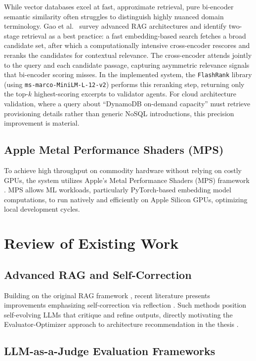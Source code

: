 While vector databases excel at fast, approximate retrieval, pure bi-encoder semantic similarity often struggles to distinguish highly nuanced domain terminology. Gao et al.~\cite{gao2023retrieval} survey advanced RAG architectures and identify two-stage retrieval as a best practice: a fast embedding-based search fetches a broad candidate set, after which a computationally intensive cross-encoder rescores and reranks the candidates for contextual relevance. The cross-encoder attends jointly to the query and each candidate passage, capturing asymmetric relevance signals that bi-encoder scoring misses. In the implemented system, the \texttt{FlashRank} library (using \texttt{ms-marco-MiniLM-L-12-v2}) performs this reranking step, returning only the top-$k$ highest-scoring excerpts to validator agents. For cloud architecture validation, where a query about ``DynamoDB on-demand capacity'' must retrieve provisioning details rather than generic NoSQL introductions, this precision improvement is material.


\subsection{Apple Metal Performance Shaders (MPS)}

To achieve high throughput on commodity hardware without relying on costly GPUs, the system utilizes Apple’s Metal Performance Shaders (MPS) framework \cite{apple2024mps}. MPS allows ML workloads, particularly PyTorch-based embedding model computations, to run natively and efficiently on Apple Silicon GPUs, optimizing local development cycles.

\section{Review of Existing Work}

\subsection{Advanced RAG and Self-Correction}

Building on the original RAG framework \cite{lewis2020rag}, recent literature presents improvements emphasizing self-correction via reflection \cite{asai2023selfrag}. Such methods position self-evolving LLMs that critique and refine outputs, directly motivating the Evaluator-Optimizer approach to architecture recommendation in the thesis \cite{anthropic2024agents}.

\subsection{LLM-as-a-Judge Evaluation Frameworks}

